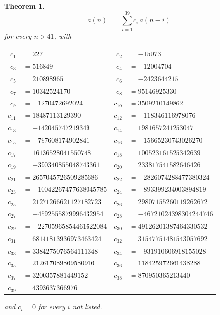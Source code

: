 \documentclass[11pt,a4paper]{article}
\theoremstyle{plain}
\newtheorem{theorem}{Theorem}
\theoremstyle{definition}
\begin{document}
\begin{theorem}
\[
a(n)\;=\;\sum_{i=1}^{39}c_i\,a(n-i)
\]
for every $n>41$, with
\begin{center}\footnotesize
\begin{tabular}{r@{\,}l@{\qquad}r@{\,}l}
$c_{1}$ & $=227$ & $c_{2}$ & $=-15073$ \\
$c_{3}$ & $=516849$ & $c_{4}$ & $=-12004704$ \\
$c_{5}$ & $=210898965$ & $c_{6}$ & $=-2423644215$ \\
$c_{7}$ & $=10342524170$ & $c_{8}$ & $=95146925330$ \\
$c_{9}$ & $=-1270472692024$ & $c_{10}$ & $=3509210149862$ \\
$c_{11}$ & $=18487113129390$ & $c_{12}$ & $=-118346116978076$ \\
$c_{13}$ & $=-142045747219349$ & $c_{14}$ & $=1981657241253047$ \\
$c_{15}$ & $=-797608174902841$ & $c_{16}$ & $=-15665230743026270$ \\
$c_{17}$ & $=16136528041550748$ & $c_{18}$ & $=100523161525342639$ \\
$c_{19}$ & $=-390340855048743361$ & $c_{20}$ & $=233817541582646426$ \\
$c_{21}$ & $=2657045726509285686$ & $c_{22}$ & $=-2826074288477380324$ \\
$c_{23}$ & $=-10042267477638045785$ & $c_{24}$ & $=-893399234003894819$ \\
$c_{25}$ & $=21271266621127182723$ & $c_{26}$ & $=29807155260119262672$ \\
$c_{27}$ & $=-4592555879996432954$ & $c_{28}$ & $=-46721024398304244746$ \\
$c_{29}$ & $=-22705965854461622084$ & $c_{30}$ & $=49126201387464330532$ \\
$c_{31}$ & $=68141813936973463424$ & $c_{32}$ & $=31547751481543057692$ \\
$c_{33}$ & $=3384275076564111348$ & $c_{34}$ & $=-931910606918155028$ \\
$c_{35}$ & $=212617089869580916$ & $c_{36}$ & $=118425972661438288$ \\
$c_{37}$ & $=3200357881449152$ & $c_{38}$ & $=870950365213440$ \\
$c_{39}$ & $=4393637366976$ \\
\end{tabular}
\end{center}
and $c_i=0$ for every $i$ not listed.
\end{theorem}
\end{document}
